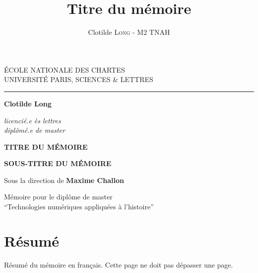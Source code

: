 \documentclass[12pt,twoside]{book}
\author{Clotilde \textsc{Long} - M2 TNAH}
\title{Titre du mémoire}
\begin{document}
	\begin{titlepage}
		\begin{center}
			
			\bigskip
			
			\begin{large}				
				ÉCOLE NATIONALE DES CHARTES\\
				UNIVERSITÉ PARIS, SCIENCES \& LETTRES
			\end{large}
			\begin{center}\rule{2cm}{0.02cm}\end{center}
			
			\bigskip
			\bigskip
			\bigskip
			\begin{Large}
				\textbf{Clotilde Long}\\
			\end{Large}
			\begin{normalsize} \textit{licencié.e ès lettres}\\
				\textit{diplômé.e de master}
			\end{normalsize}
			
			\bigskip
			\bigskip
			\bigskip
			
			\begin{Huge}
				\textbf{TITRE DU MÉMOIRE}\\
			\end{Huge}
			\bigskip
			\bigskip
			\begin{LARGE}
				\textbf{SOUS-TITRE DU MÉMOIRE}\\
			\end{LARGE}
			
			\bigskip
			\bigskip
			\bigskip
			\begin{large}
				Sous la direction de \textbf{Maxime Challon}
			\end{large}
			\vfill
			
			\begin{large}
				Mémoire 
				pour le diplôme de master \\
				\enquote{Technologies numériques appliquées à l'histoire} \\
			\end{large}
			
		\end{center}
	\end{titlepage}

	\thispagestyle{empty}	
	\cleardoublepage
	
\frontmatter

	\chapter{Résumé}
\medskip
	Résumé du mémoire en français. Cette page ne doit pas dépasser une page.\\
	
\end{document}
